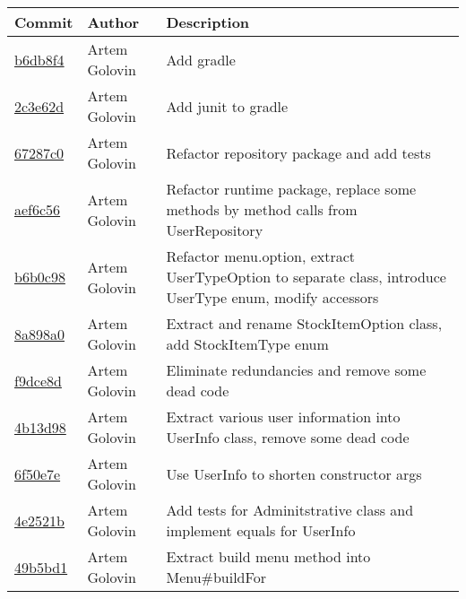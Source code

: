 \begin{tabularx}{\textwidth}{l l X}\textbf{Commit} & \textbf{Author} & \textbf{Description}\\ \hline
\href{https://github.com/awave1/assessment-loan-system/commit/b6db8f46362b69749f0ab51aa74c21bfd5c0735a}{b6db8f4} & Artem Golovin & Add gradle\\ \hline
\href{https://github.com/awave1/assessment-loan-system/commit/2c3e62d1230df91dce3ae401eacf0675cc67b6da}{2c3e62d} & Artem Golovin & Add junit to gradle\\ \hline
\href{https://github.com/awave1/assessment-loan-system/commit/67287c032e1134f22c6814f7fc4444dedbe694ff}{67287c0} & Artem Golovin & Refactor repository package and add tests\\ \hline
\href{https://github.com/awave1/assessment-loan-system/commit/aef6c56b44100119cbf74f7b0781316c9ec98bd0}{aef6c56} & Artem Golovin & Refactor runtime package, replace some methods by method calls from UserRepository\\ \hline
\href{https://github.com/awave1/assessment-loan-system/commit/b6b0c982f35695c9f9bb0eea222788ba911f6f26}{b6b0c98} & Artem Golovin & Refactor menu.option, extract UserTypeOption to separate class, introduce UserType enum, modify accessors\\ \hline
\href{https://github.com/awave1/assessment-loan-system/commit/8a898a0ca9406ffb32fb65c40485973b1f50e97a}{8a898a0} & Artem Golovin & Extract and rename StockItemOption class, add StockItemType enum\\ \hline
\href{https://github.com/awave1/assessment-loan-system/commit/f9dce8df807e66be235470e3b729dadba625db99}{f9dce8d} & Artem Golovin & Eliminate redundancies and remove some dead code\\ \hline
\href{https://github.com/awave1/assessment-loan-system/commit/4b13d98a4d8992145c4e31197e92a4c8ff3a358d}{4b13d98} & Artem Golovin & Extract various user information into UserInfo class, remove some dead code\\ \hline
\href{https://github.com/awave1/assessment-loan-system/commit/6f50e7e117fdaed88d909634a06482e2ce707c13}{6f50e7e} & Artem Golovin & Use UserInfo to shorten constructor args\\ \hline
\href{https://github.com/awave1/assessment-loan-system/commit/4e2521bdd5dcea1574b0d366cd50967f7d4784f8}{4e2521b} & Artem Golovin & Add tests for Adminitstrative class and implement equals for UserInfo\\ \hline
\href{https://github.com/awave1/assessment-loan-system/commit/49b5bd194a4906675a3ec4213401daf093d152db}{49b5bd1} & Artem Golovin & Extract build menu method into Menu\#buildFor\\ \hline

\end{tabularx}

